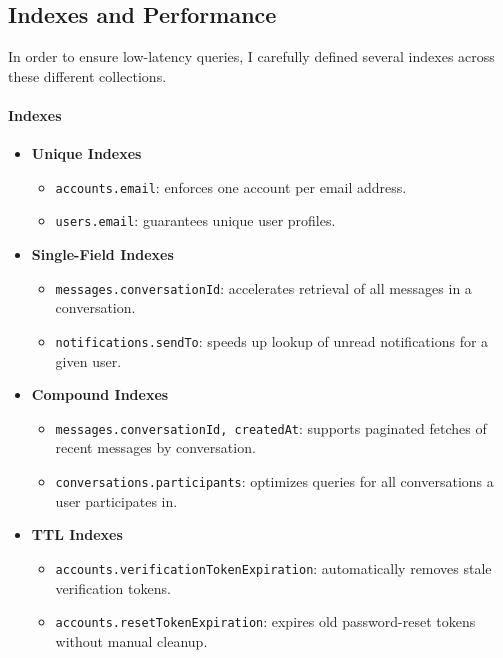 \subsection{Indexes and Performance}

In order to ensure low-latency queries, I carefully defined several indexes across these different collections.

\paragraph{Indexes}
\begin{itemize}
  \item \textbf{Unique Indexes}
    \begin{itemize}
      \item \texttt{accounts.email}: enforces one account per email address.
      \item \texttt{users.email}: guarantees unique user profiles.
    \end{itemize}

  \item \textbf{Single-Field Indexes}
    \begin{itemize}
      \item \texttt{messages.conversationId}: accelerates retrieval of all messages in a conversation.
      \item \texttt{notifications.sendTo}: speeds up lookup of unread notifications for a given user.
    \end{itemize}

  \item \textbf{Compound Indexes}
    \begin{itemize}
      \item \texttt{messages.{conversationId, createdAt}}: supports paginated fetches of recent messages by conversation.
      \item \texttt{conversations.participants}: optimizes queries for all conversations a user participates in.
    \end{itemize}

  \item \textbf{TTL Indexes}
    \begin{itemize}
      \item \texttt{accounts.verificationTokenExpiration}: automatically removes stale verification tokens.
      \item \texttt{accounts.resetTokenExpiration}: expires old password-reset tokens without manual cleanup.
    \end{itemize}
\end{itemize}

